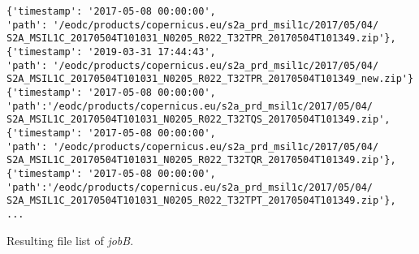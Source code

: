 \documentclass[draft,final]{vutinfth} %
\newenvironment{code}{\captionsetup{type=listing}}{}
\begin{document}
\begin{enumerate}
	\begin{code}
		\begin{verbatim}
{'timestamp': '2017-05-08 00:00:00', 
'path': '/eodc/products/copernicus.eu/s2a_prd_msil1c/2017/05/04/
S2A_MSIL1C_20170504T101031_N0205_R022_T32TPR_20170504T101349.zip'}, 
{'timestamp': '2019-03-31 17:44:43', 
'path': '/eodc/products/copernicus.eu/s2a_prd_msil1c/2017/05/04/
S2A_MSIL1C_20170504T101031_N0205_R022_T32TPR_20170504T101349_new.zip'}
{'timestamp': '2017-05-08 00:00:00',
'path':'/eodc/products/copernicus.eu/s2a_prd_msil1c/2017/05/04/
S2A_MSIL1C_20170504T101031_N0205_R022_T32TQS_20170504T101349.zip', 
{'timestamp': '2017-05-08 00:00:00', 
'path': '/eodc/products/copernicus.eu/s2a_prd_msil1c/2017/05/04/
S2A_MSIL1C_20170504T101031_N0205_R022_T32TQR_20170504T101349.zip'}, 
{'timestamp': '2017-05-08 00:00:00',
'path':'/eodc/products/copernicus.eu/s2a_prd_msil1c/2017/05/04/
S2A_MSIL1C_20170504T101031_N0205_R022_T32TPT_20170504T101349.zip'},
...
		\end{verbatim}
		\caption{Resulting file list of \textit{jobB}.}
		\label{lst:eva_datachange_fl3}
	\end{code}
	

\end{enumerate}
\end{document}
